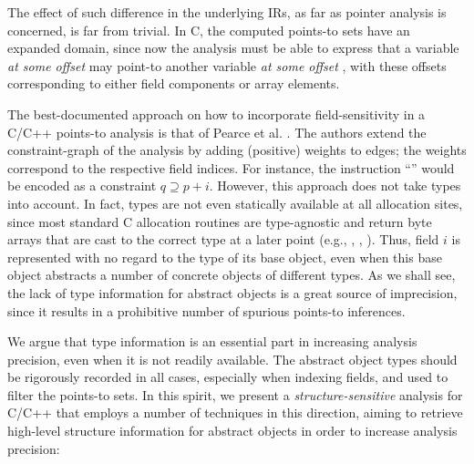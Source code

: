 The effect of such difference in the underlying IRs, as far as pointer
analysis is concerned, is far from trivial. In C, the computed
points-to sets have an expanded domain, since now the analysis must
be able to express that a variable  \emph{at some offset}
 may point-to another variable  \emph{at some offset}
, with these offsets corresponding to either field components or
array elements.

The best-documented approach on how to incorporate
field-sensitivity in a C/C++ points-to analysis is that of Pearce et
al. \cite{paste/PearceKH04,toplas/PearceKH07}. The authors extend the
constraint-graph of the analysis by adding (positive) weights to 
edges; the weights correspond to the respective field indices. For
instance, the instruction ``'' would
be encoded as a constraint $q \supseteq p + i$. However, this approach
does not take types into account. In fact, types are not even
statically available at all allocation sites, since most standard C
allocation routines are type-agnostic and return byte arrays that are
cast to the correct type at a later point (e.g., ,
, ).  Thus, field $i$ is represented
with no regard to the type of its base object, even when this base
object abstracts a number of concrete objects of different types. As we
shall see, the
lack of type information for abstract objects is a great source of
imprecision, since it results in a prohibitive number of spurious
points-to inferences.

We argue that type information is an essential part in increasing
analysis precision, even when it is not readily available. The
abstract object types should be rigorously recorded in all cases,
especially when indexing fields, and used to filter the points-to
sets. In this spirit, we present a \emph{structure-sensitive} analysis
for C/C++ that employs a number of techniques in this direction,
aiming to retrieve high-level structure information for abstract
objects in order to increase analysis precision:

